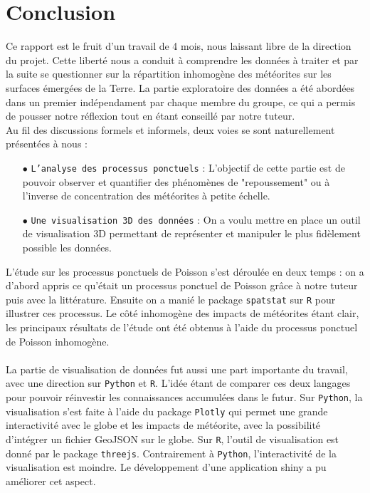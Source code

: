\documentclass[12pt]{article}
\begin{document}
\section{Conclusion}
Ce rapport est le fruit d'un travail de 4 mois, nous laissant libre de la direction du projet. Cette liberté nous a conduit à comprendre les données à traiter et par la suite se questionner sur la répartition inhomogène des météorites sur les surfaces émergées de la Terre. 
La partie exploratoire des données a été abordées dans un premier indépendament par chaque membre du groupe, ce qui a permis de pousser notre réflexion tout en étant conseillé par notre tuteur.
\\
Au fil des discussions formels et informels, deux voies se sont naturellement présentées à nous :
\\
\begin{itemize}
    \item[$\bullet$] \texttt{L'analyse des processus ponctuels} : L'objectif de cette partie est de pouvoir observer et quantifier des phénomènes de "repoussement" ou à l'inverse de concentration des météorites à petite échelle.
    \\
    \item[$\bullet$] \texttt{Une visualisation 3D des données} : On a voulu mettre en place un outil de visualisation 3D permettant de représenter et manipuler le plus fidèlement possible les données.\\
\end{itemize}
L'étude sur les processus ponctuels de Poisson s'est déroulée en deux temps : on a d'abord appris ce qu'était un processus ponctuel de Poisson grâce à notre tuteur puis avec la littérature. Ensuite on a manié le package \texttt{spatstat} sur \texttt{R} pour illustrer ces processus. Le côté inhomogène des impacts de météorites étant clair, les principaux résultats de l'étude ont été obtenus à l'aide du processus ponctuel de Poisson inhomogène.\\
\\
La partie de visualisation de données fut aussi une part importante du travail, avec une direction sur \texttt{Python} et \texttt{R}. L'idée étant de comparer ces deux langages pour pouvoir réinvestir les connaissances accumulées dans le futur. Sur \texttt{Python}, la visualisation s'est faite à l'aide du package \texttt{Plotly} qui permet une grande interactivité avec le globe et les impacts de météorite, avec la possibilité d'intégrer un fichier GeoJSON sur le globe. Sur \texttt{R}, l'outil de visualisation est donné par le package \texttt{threejs}. Contrairement à \texttt{Python}, l'interactivité de la visualisation est moindre. Le développement d'une application shiny a pu améliorer cet aspect.\\
\end{document}
